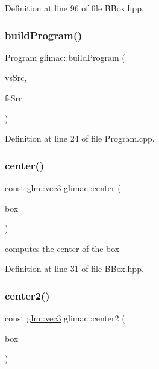 Definition at line 96 of file B\+Box.\+hpp.

\mbox{\label{namespaceglimac_a3d534d78277f9bab3c4fa83f263f3633}} 
\subsubsection{\texorpdfstring{build\+Program()}{buildProgram()}}
{\footnotesize\ttfamily \hyperlink{classglimac_1_1_program}{Program} glimac\+::build\+Program (\begin{DoxyParamCaption}\item[{const G\+Lchar $\ast$}]{vs\+Src,  }\item[{const G\+Lchar $\ast$}]{fs\+Src }\end{DoxyParamCaption})}



Definition at line 24 of file Program.\+cpp.

\mbox{\label{namespaceglimac_ae7ea0ad7ad60966328b8b2a198ad1dc5}} 
\subsubsection{\texorpdfstring{center()}{center()}}
{\footnotesize\ttfamily const \hyperlink{group__core__types_ga1c47e8b3386109bc992b6c48e91b0be7}{glm\+::vec3} glimac\+::center (\begin{DoxyParamCaption}\item[{const \hyperlink{structglimac_1_1_b_box3f}{B\+Box3f} \&}]{box }\end{DoxyParamCaption})\hspace{0.3cm}{\ttfamily [inline]}}

computes the center of the box 

Definition at line 31 of file B\+Box.\+hpp.

\mbox{\label{namespaceglimac_a1286d34984f2db1de4b7a161bcdcc79d}} 
\subsubsection{\texorpdfstring{center2()}{center2()}}
{\footnotesize\ttfamily const \hyperlink{group__core__types_ga1c47e8b3386109bc992b6c48e91b0be7}{glm\+::vec3} glimac\+::center2 (\begin{DoxyParamCaption}\item[{const \hyperlink{structglimac_1_1_b_box3f}{B\+Box3f} \&}]{box }\end{DoxyParamCaption})\hspace{0.3cm}{\ttfamily [inline]}}



